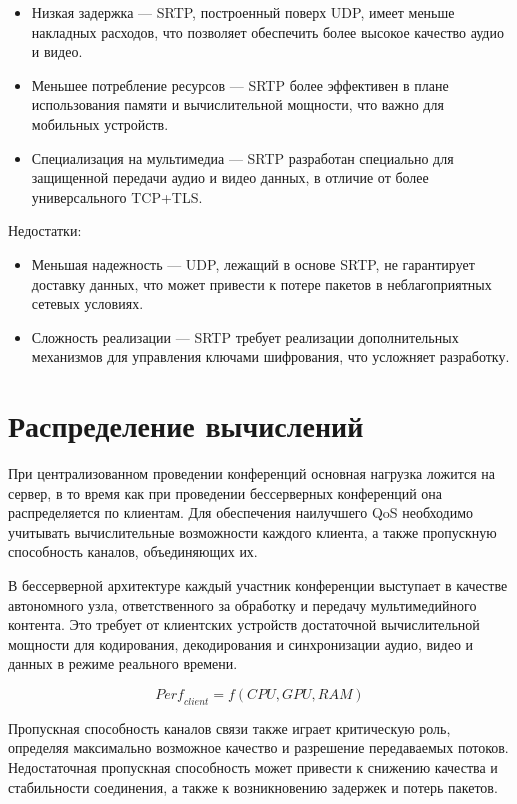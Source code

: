 \begin{itemize}[label=---]
  \item Низкая задержка --- SRTP, построенный поверх UDP, имеет меньше накладных расходов, что позволяет обеспечить более высокое качество аудио и видео.
  \item Меньшее потребление ресурсов --- SRTP более эффективен в плане использования памяти и вычислительной мощности, что важно для мобильных устройств.
  \item Специализация на мультимедиа --- SRTP разработан специально для защищенной передачи аудио и видео данных, в отличие от более универсального TCP+TLS.
\end{itemize}
  
Недостатки:

\begin{itemize}[label=---]
  \item Меньшая надежность --- UDP, лежащий в основе SRTP, не гарантирует доставку данных, что может привести к потере пакетов в неблагоприятных сетевых условиях.
  \item Сложность реализации --- SRTP требует реализации дополнительных механизмов для управления ключами шифрования, что усложняет разработку.
\end{itemize}

\section{Распределение вычислений}

При централизованном проведении конференций основная нагрузка ложится на сервер, в то время как при проведении бессерверных конференций она распределяется по клиентам. Для обеспечения наилучшего QoS необходимо учитывать вычислительные возможности каждого клиента, а также пропускную способность каналов, объединяющих их.

В бессерверной архитектуре каждый участник конференции выступает в качестве автономного узла, ответственного за обработку и передачу мультимедийного контента. Это требует от клиентских устройств достаточной вычислительной мощности для кодирования, декодирования и синхронизации аудио, видео и данных в режиме реального времени.

\begin{equation}
  \textit{Perf}_{client} = f(CPU, GPU, RAM)
\end{equation}

Пропускная способность каналов связи также играет критическую роль, определяя максимально возможное качество и разрешение передаваемых потоков. Недостаточная пропускная способность может привести к снижению качества и стабильности соединения, а также к возникновению задержек и потерь пакетов.

